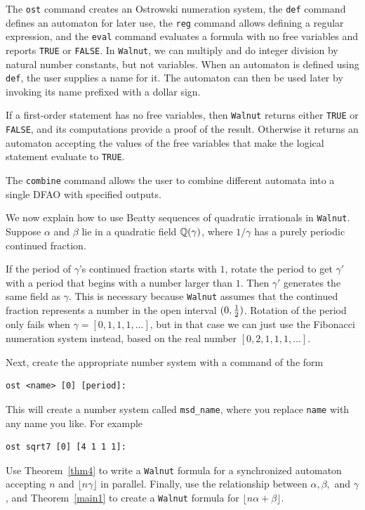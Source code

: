 \documentclass[12pt,reqno]{article}
\begin{document}
The {\tt ost} command creates an Ostrowski numeration system, the {\tt def} command defines an automaton for later use, the {\tt reg} command allows defining a regular expression, and the {\tt eval} command evaluates
a formula with no free variables and reports {\tt TRUE} or
{\tt FALSE}.   In {\tt Walnut}, we can multiply and do integer
division by natural number constants, but not variables.  When an automaton
is defined using {\tt def}, the user supplies a name for it.  The automaton
can then be used later by invoking its name prefixed with a dollar sign.

If a first-order statement has no free variables, then {\tt Walnut} returns
either {\tt TRUE} or {\tt FALSE}, and its computations provide a proof of
the result.  Otherwise it returns an automaton accepting the values of the
free variables that make the logical statement evaluate to {\tt TRUE}.

The {\tt combine} command allows the user to combine different automata
into a single DFAO with specified outputs.

We now explain how to use Beatty sequences of quadratic irrationals in 
{\tt Walnut}.  Suppose $\alpha$ and $\beta$ lie in a quadratic field $\mathbb{Q}(\gamma)$, where $1/\gamma$ 
has a purely periodic continued fraction.

If the period of $\gamma$'s continued fraction starts with
$1$, rotate the period to get $\gamma'$ with a period that begins with a number larger than $1$.   Then $\gamma'$ generates the same
field as $\gamma$.  This is necessary because {\tt Walnut} assumes
that the continued fraction represents a number in the open
interval $(0, {1\over 2})$.
Rotation of the period only
fails when $\gamma = [0,1,1,1,\ldots]$, but in that
case we can just use the Fibonacci numeration system instead, based
on the real number $[0,2,1,1,1,\ldots]$.

Next, create the appropriate number system with a command
of the form 
\begin{verbatim}
ost <name> [0] [period]:
\end{verbatim}
This will create a number system called
{\tt msd\_name}, where you replace {\tt name} with any
name you like.  For example
\begin{verbatim}
ost sqrt7 [0] [4 1 1 1]:
\end{verbatim}

Use Theorem~\ref{thm4} to write a {\tt Walnut} formula
for a synchronized automaton accepting $n$ and
$\lfloor n \gamma \rfloor$ in parallel.
Finally, use the relationship between $\alpha, \beta, $
and $\gamma$, and Theorem~\ref{main1} to create a 
{\tt Walnut} formula for 
$\lfloor n  \alpha + \beta \rfloor$.
\end{document}
